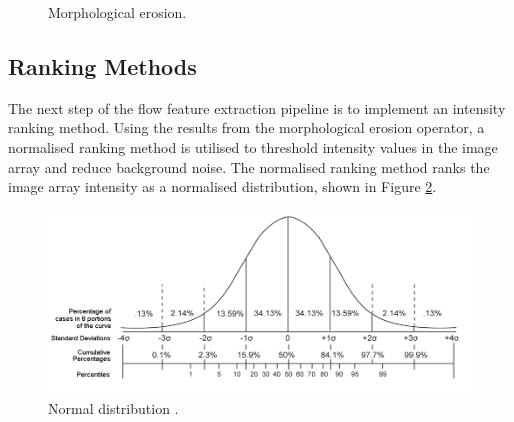 \begin{figure}[H]
  \centering
  \hfill
  \caption{Morphological erosion.}
  \label{fig:erosion_img}
\end{figure}

\subsection{Ranking Methods}
The next step of the flow feature extraction pipeline is to implement an intensity ranking method. Using the results from the morphological erosion operator, a normalised ranking method is utilised to threshold intensity values in the image array and reduce background noise. The normalised ranking method ranks the image array intensity as a normalised distribution, shown in Figure \ref{fig:dist}. 

\begin{figure}[H] 
	\centering
	\includegraphics[width=1\textwidth]{dist.png} 
	\caption{Normal distribution \citep{brownlee1965statistical}.}
	\label{fig:dist}
\end{figure}

